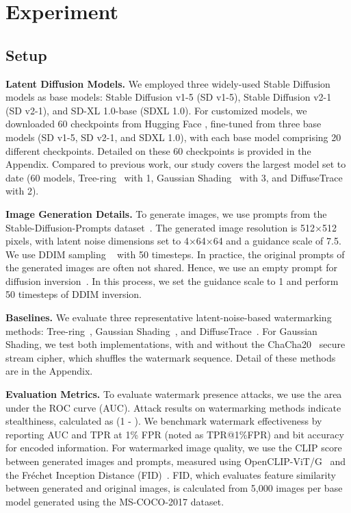 \section{Experiment}

\subsection{Setup}
\label{sec:experiment_setup}
\noindent
\textbf{Latent Diffusion Models.} 
We employed three widely-used Stable Diffusion models as base models: Stable Diffusion v1-5 (SD v1-5), Stable Diffusion v2-1 (SD v2-1), and SD-XL 1.0-base (SDXL 1.0). 
For customized models, we downloaded 60 checkpoints from Hugging Face \cite{huggingface}, fine-tuned from three base models (SD v1-5, SD v2-1, and SDXL 1.0), with each base model comprising 20 different checkpoints. Detailed on these 60 checkpoints is provided in the Appendix.
Compared to previous work, our study covers the largest model set to date (60 models, \vs Tree-ring~\cite{wen2023tree} with 1, Gaussian Shading~\cite{yang2024gaussian} with 3, and DiffuseTrace~\cite{lei2024diffusetrace} with 2).

\noindent
\textbf{Image Generation Details.}  
To generate images, we use prompts from the Stable-Diffusion-Prompts dataset~\cite{Gustavosta}. The generated image resolution is 512×512 pixels, with latent noise dimensions set to 4×64×64 and a guidance scale of 7.5. We use DDIM sampling ~\cite{song2020denoising} with 50 timesteps. In practice, the original prompts of the generated images are often not shared. Hence, we use an empty prompt for diffusion inversion~\cite{dimm_inversion}. In this process, we set the guidance scale to 1 and perform 50 timesteps of DDIM inversion.

\noindent
\textbf{Baselines.} 
We evaluate three representative latent-noise-based watermarking methods: Tree-ring~\cite{wen2023tree}, Gaussian Shading~\cite{yang2024gaussian}, and DiffuseTrace~\cite{lei2024diffusetrace}. 
For Gaussian Shading, we test both implementations, with and without the ChaCha20~\cite{bernstein2008chacha} secure stream cipher, which shuffles the watermark sequence. Detail of these methods are in the Appendix.

\noindent
\textbf{Evaluation Metrics.} To evaluate watermark presence attacks, we use the area under the ROC curve (AUC). Attack results on watermarking methods indicate stealthiness, calculated as (1 - ). We benchmark watermark effectiveness by reporting AUC and TPR at 1\% FPR (noted as TPR@1\%FPR) and bit accuracy for encoded information. For watermarked image quality, we use the CLIP score~\cite{radford2021learning} between generated images and prompts, measured using OpenCLIP-ViT/G~\cite{Cherti_2023_CVPR} and the Fréchet Inception Distance (FID)~\cite{NIPS2017_heuselgans}. FID, which evaluates feature similarity between generated and original images, is calculated from 5,000 images per base model generated using the MS-COCO-2017 dataset\cite{lin2014microsoft}.


